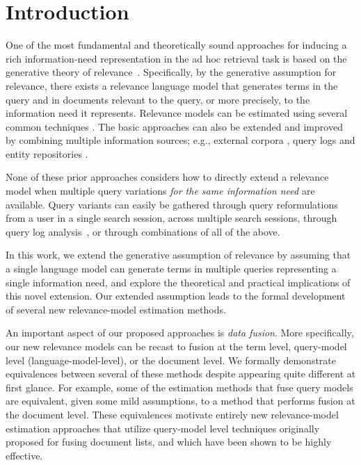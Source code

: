 \section{Introduction}\label{sec-intro}

One of the most fundamental and theoretically sound approaches for
inducing a rich information-need representation in the ad hoc
retrieval task is based on the generative theory of
relevance~\cite{Lavrenko+Croft:03a}.
Specifically, by the generative assumption for relevance, there
exists a relevance language model that generates terms in the query
and in documents relevant to the query, or more precisely, to the
information need it represents.
Relevance models can be estimated using several common techniques
\cite{Lavrenko+Croft:03a,Abdul-Jaleel+al:04a,Lv+Zhai:10a,Seo+Croft:10a}.
The basic approaches can also be extended and improved by combining
multiple information sources; e.g., external corpora
\cite{Diaz+Metzler:06a}, query logs \cite{bmc12-wsdm} and entity
repositories \cite{dda14-sigir}.

None of these prior approaches considers how to directly extend a
relevance model when multiple query variations {\em for the same
information need} are available.
Query variants can easily be gathered through query reformulations
from a user in a single search session, across multiple search
sessions, through query log analysis~{\cite{wnz01-www,sssc11wsdm}},
or through combinations of all of the above.

In this work, we extend the generative assumption of relevance by
assuming that a single language model can generate terms in multiple
queries representing a single information need, and explore the
theoretical and practical implications of this novel extension.
Our extended assumption leads to the formal development of several
new relevance-model estimation methods.

An important aspect of our proposed approaches is {\em data fusion}.
More specifically, our new relevance models can be recast to fusion
at the term level, query-model level (language-model-level), or the
document level.
We formally demonstrate equivalences between several of these methods
despite appearing quite different at first glance.
For example, some of the estimation methods that fuse query models
are equivalent, given some mild assumptions, to a method that
performs fusion at the document level.
These equivalences motivate entirely new relevance-model estimation
approaches that utilize query-model level techniques originally
proposed for fusing document lists, and which have been shown to be
highly effective.

